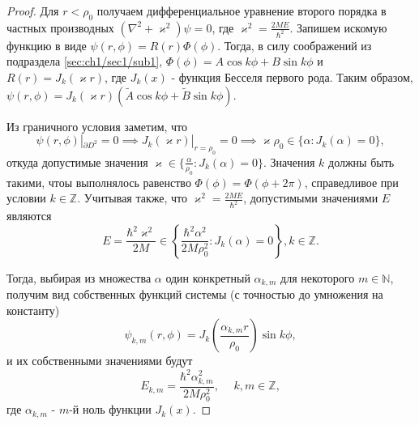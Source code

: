 \begin{proof}
Для $r < \rho_0$ получаем дифференциальное уравнение второго порядка в частных производных $(\nabla^2 + \varkappa^2)\psi = 0$, где $\varkappa^2 = \frac{2M E}{\hbar^2}$. Запишем искомую функцию в виде $\psi(r, \phi) = R(r)\Phi(\phi)$. Тогда, в силу соображений из подраздела \ref{sec:ch1/sec1/sub1}, $\Phi(\phi) = A\cos{k\phi} + B\sin{k\phi}$ и $R(r) = J_k(\varkappa r)$, где $J_k(x)$ - функция Бесселя первого рода. Таким образом, $\psi(r, \phi) = J_k(\varkappa r) (\widetilde{A}\cos{k\phi} + \widetilde{B}\sin{k\phi} )$.

Из граничного условия заметим, что $$\psi(r, \phi) |_{\partial D^2} = 0 \implies J_k(\varkappa r)|_{r=\rho_0} = 0 \implies \varkappa \rho_0 \in \{\alpha: J_k(\alpha) = 0\},$$
откуда допустимые значения $\varkappa \in \{ \frac{\alpha}{\rho_0} : J_k(\alpha)=0 \}$. Значения $k$ должны быть такими, чтоы выполнялось равенство $\Phi(\phi) = \Phi(\phi+2\pi)$, справедливое при условии $k \in \mathbb{Z}$. Учитывая также, что $\varkappa^2 = \frac{2M E}{\hbar^2}$, допустимыми значениями $E$ являются
$$E = \frac{\hbar^2\varkappa^2}{2M} \in \left\{ \frac{\hbar^2\alpha^2}{2M\rho_0^2}: J_k(\alpha)=0 \right\}, k \in \mathbb{Z}.$$

Тогда, выбирая из множества $\alpha$ один конкретный $\alpha_{k, m}$ для некоторого $m \in \mathbb{N}$, получим вид собственных функций системы (с точностью до умножения на константу) 
$$\psi_{k, m}(r, \phi) = J_k\left(\frac{\alpha_{k, m}r}{\rho_0}\right) \sin{k\phi},$$
и их собственными значениями будут
$$E_{k, m} = \frac{\hbar^2\alpha_{k, m}^2}{2M\rho_0^2}, \hspace{15pt} k, m \in \mathbb{Z},$$
где $\alpha_{k, m}$ - $m$-й ноль функции $J_k(x)$.
\end{proof}

